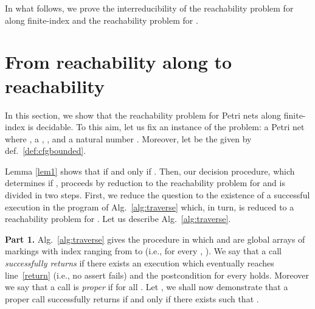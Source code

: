 \documentclass{fsttcs}
\begin{document}
In what follows, we prove the interreducibility of the reachability
problem for  along finite-index  and the reachability
problem for .
 \section{From  reachability along  to  reachability}\label{sec:reduc_pierre}

In this section, we show that the reachability problem for Petri nets along
finite-index   is decidable. To this aim, let us fix an instance of the problem: a Petri net  where
,  a  ,
, and a natural number   . Moreover, let
 be the 
given by def.~\ref{def:cfgbounded}. 
	
Lemma \ref{lem1} shows that 
if and only if . Then, our decision
procedure, which determines if
, proceeds by reduction to the
reachability problem for  and is divided in two steps.  First, we
reduce the question  to the
existence of a successful execution in the program of Alg.~\ref{alg:traverse}
which, in turn, is reduced to a reachability problem for .
Let us describe Alg.~\ref{alg:traverse}.

\noindent \begin{minipage}[t]{.33\linewidth}
	{\bf Part 1.} Alg.~\ref{alg:traverse} gives the procedure  in which
 	 and  are
global arrays of markings with index ranging from  to  (i.e., for every
, ).  We say that a call 
\emph{successfully returns} if there exists an execution which eventually
rea\-ches line~\ref{return} (i.e., no assert fails) and the 
postcondition  for every  holds. Moreover we say that a
call  is \emph{proper} if  for all . 
Let
, we shall now demonstrate that a proper call
 successfully returns if and only if there exists
 such that .
\end{minipage}\begin{minipage}[t]{.65\linewidth}
\vspace{-3pt}
\begin{algorithm}[H]
\DontPrintSemicolon
	\LinesNumbered
 \caption{\label{alg:traverse}}
\end{algorithm}\end{minipage}
\end{document}
